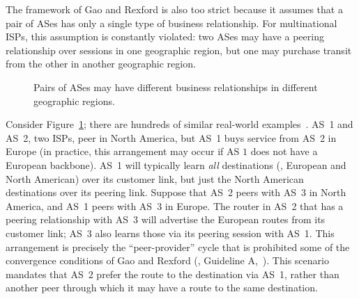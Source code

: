 The framework of Gao and Rexford is also too strict because it assumes
that a pair of ASes has only a single type of business relationship. For
multinational ISPs, this assumption is constantly violated: two ASes may
have a peering relationship over sessions in one geographic region, but
one may purchase transit from the other in another geographic region.

\begin{figure}
\centering
{}
\caption[Pairs of ASes may have different relationships
in different geographic regions.]{Pairs of ASes may have different
business relationships 
in different geographic regions.}
\label{fig:peerprov}
\end{figure}


\begin{example}
Consider Figure~\ref{fig:peerprov}; there are hundreds of similar
real-world examples~\cite{bush:privcomm}.  AS~1 and AS~2, two ISPs, peer
in North America, but AS~1 buys service from AS~2 in Europe (in
practice, this arrangement may occur if AS $1$ does not have a European
backbone).  AS~1 will typically learn {\em all} destinations (\ie,
European and North American) over its customer link, but just the North
American destinations over its peering link.  Suppose that AS~2 peers
with AS~3 in North America, and AS~1 peers with AS~3 in Europe.  The
router in AS~2 that has a peering relationship with AS~3 will advertise
the European routes from its customer link; AS~3 also learns those via
its peering session with AS~1.  This arrangement is precisely the
``peer-provider'' cycle that is prohibited some of the convergence
conditions of Gao and Rexford (\eg, Guideline A,~\cite{Gao2001a}).  This
scenario mandates that AS~2 prefer the route to the destination via
AS~1, rather than another peer through which it may have a route to the
same destination.
\end{example}




